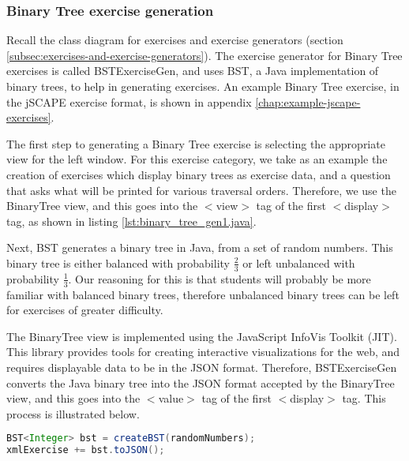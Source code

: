 \subsubsection{Binary Tree exercise generation}
Recall the class diagram for exercises and exercise generators (section \ref{subsec:exercises-and-exercise-generators}). The exercise generator for Binary Tree exercises is called \textsf{BSTExerciseGen}, and uses \textsf{BST}, a Java implementation of binary trees, to help in generating exercises. An example Binary Tree exercise, in the jSCAPE exercise format, is shown in appendix \ref{chap:example-jscape-exercises}.\newline

The first step to generating a Binary Tree exercise is selecting the appropriate view for the left window. For this exercise category, we take as an example the creation of exercises which display binary trees as exercise data, and a question that asks what will be printed for various traversal orders. Therefore, we use the \textsf{BinaryTree} view, and this goes into the \textsf{$<$view$>$} tag of the first \textsf{$<$display$>$} tag, as shown in listing \ref{lst:binary_tree_gen1.java}.\newline



Next, \textsf{BST} generates a binary tree in Java, from a set of random numbers. This binary tree is either balanced with probability $\frac{2}{3}$ or left unbalanced with probability $\frac{1}{3}$. Our reasoning for this is that students will probably be more familiar with balanced binary trees, therefore unbalanced binary trees can be left for exercises of greater difficulty.\newline

The \textsf{BinaryTree} view is implemented using the JavaScript InfoVis Toolkit (JIT)\cite{JIT}. This library provides tools for creating interactive visualizations for the web, and requires displayable data to be in the JSON format. Therefore, \textsf{BSTExerciseGen} converts the Java binary tree into the JSON format accepted by the \textsf{BinaryTree} view, and this goes into the \textsf{$<$value$>$} tag of the first \textsf{$<$display$>$} tag. This process is illustrated below. \newline

\begin{lstlisting}[language={Java}, label={lst:binary_tree_gen2.java}]
BST<Integer> bst = createBST(randomNumbers);
xmlExercise += bst.toJSON();               
\end{lstlisting}

